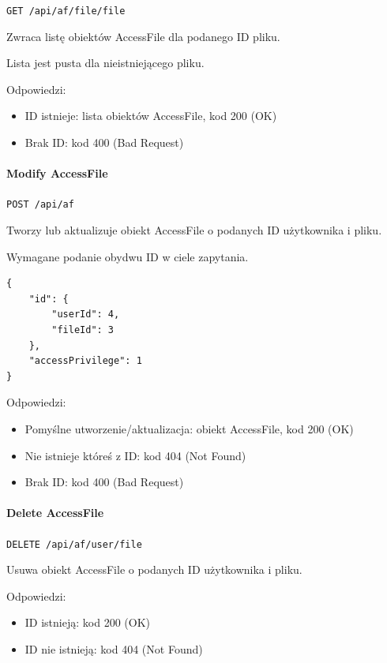 \documentclass[a4paper,twoside,12pt]{book}
\begin{document}
\texttt{GET /api/af/file/{file}}

Zwraca listę obiektów AccessFile dla podanego ID pliku.

Lista jest pusta dla nieistniejącego pliku.

Odpowiedzi: 
\begin{itemize}
	\item ID istnieje: lista obiektów AccessFile, kod 200 (OK) 
	\item Brak ID: kod 400 (Bad Request)
\end{itemize}

\paragraph{Modify AccessFile}\label{modify-accessfile}

\texttt{POST /api/af}

Tworzy lub aktualizuje obiekt AccessFile o podanych ID użytkownika i pliku.

Wymagane podanie obydwu ID w ciele zapytania.

\begin{verbatim}
{
    "id": {
        "userId": 4,
        "fileId": 3
    },
    "accessPrivilege": 1
}
\end{verbatim}

Odpowiedzi: 
\begin{itemize}
	\item Pomyślne utworzenie/aktualizacja: obiekt AccessFile, kod 200 (OK) 
	\item Nie istnieje któreś z ID: kod 404 (Not Found) 
	\item Brak ID: kod 400 (Bad Request)
\end{itemize}

\paragraph{Delete AccessFile}\label{delete-accessfile}

\texttt{DELETE /api/af/{user}/{file}}

Usuwa obiekt AccessFile o podanych ID użytkownika i pliku.

Odpowiedzi: 
\begin{itemize}
	\item ID istnieją: kod 200 (OK) 
	\item ID nie istnieją: kod 404 (Not Found)
\end{itemize}
\end{document}

